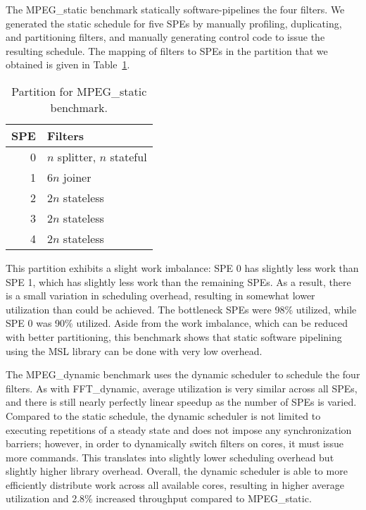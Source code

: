 The \textsf{MPEG\_static} benchmark statically software-pipelines the four filters.
We generated the static schedule for five SPEs by manually profiling, duplicating, and
partitioning filters, and manually generating control code to issue the resulting schedule.
The mapping of filters to SPEs in the partition that we obtained is given in
Table~\ref{fig:perf:mpegs}.

\begin{table}[!htb]
\begin{center}
\begin{tabular}{|r|l|}
\hline
SPE & Filters \\
\hline
0 & $n$ splitter, $n$ stateful \\
\hline
1 & $6n$ joiner \\
\hline
2 & $2n$ stateless \\
\hline
3 & $2n$ stateless \\
\hline
4 & $2n$ stateless \\
\hline
\end{tabular}
\end{center}
\caption{Partition for \textsf{MPEG\_static} benchmark.}
\label{fig:perf:mpegs}
\end{table}

This partition exhibits a slight work imbalance: SPE 0 has slightly less work than SPE 1,
which has slightly less work than the remaining SPEs.
As a result, there is a small variation in scheduling overhead, resulting in somewhat lower
utilization than could be achieved.
The bottleneck SPEs were 98\% utilized, while SPE 0 was 90\% utilized.
Aside from the work imbalance, which can be reduced with better partitioning,
this benchmark shows that static software pipelining using the MSL library can be done
with very low overhead.

The \textsf{MPEG\_dynamic} benchmark uses the dynamic scheduler to schedule the four filters.
As with \textsf{FFT\_dynamic}, average utilization is very similar across all SPEs,
and there is still nearly perfectly linear speedup as the number of SPEs is varied.
Compared to the static schedule, the dynamic scheduler is not limited to executing
repetitions of a steady state and does not impose any synchronization barriers;
however, in order to dynamically switch filters on cores, it must issue more commands.
This translates into slightly lower scheduling overhead but slightly higher library overhead.
Overall, the dynamic scheduler is able to more efficiently distribute work across
all available cores, resulting in higher average utilization and 2.8\% increased throughput
compared to \textsf{MPEG\_static}.

